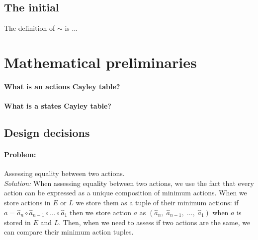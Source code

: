\subsection{The initial}


The definition of $\sim$ is ...





\section{Mathematical preliminaries}


\paragraph{What is an actions Cayley table?}


\paragraph{What is a states Cayley table?}


\paragraph{}

\subsection{Design decisions}

\paragraph{Problem:}
Assessing equality between two actions.
\\\textit{Solution:}
When assessing equality between two actions, we use the fact that every action can be expressed as a unique composition of minimum actions.
When we store actions in $E$ or $L$ we store them as a tuple of their minimum actions: if $a = \hat{a}_{n} \circ \hat{a}_{n-1} \circ \dots \circ \hat{a}_{1}$ then we store action $a$ as $(\hat{a}_{n}, \; \hat{a}_{n-1}, \; \dots, \; \hat{a}_{1})$ when $a$ is stored in $E$ and $L$.
Then, when we need to assess if two actions are the same, we can compare their minimum action tuples.

